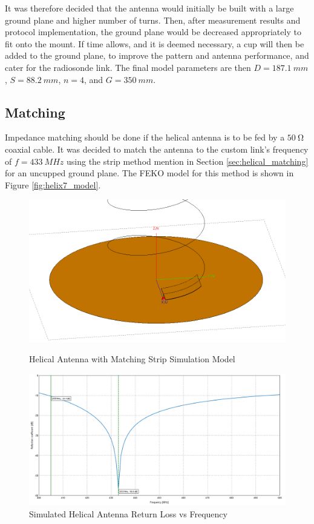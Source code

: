 It was therefore decided that the antenna would initially be built with a large ground plane and higher number of turns. Then, after measurement results and protocol implementation, the ground plane would be decreased appropriately to fit onto the mount. If time allows, and it is deemed necessary, a cup will then be added to the ground plane, to improve the pattern and antenna performance, and cater for the radiosonde link. The final model parameters are then $D = \SI{187.1}{mm}$, $S = \SI{88.2}{mm}$, $n = 4$, and $G = \SI{350}{mm}$.

\subsection{Matching}
Impedance matching should be done if the helical antenna is to be fed by a $\SI{50}{\ohm}$ coaxial cable. It was decided to match the antenna to the custom link's frequency of $f = \SI{433}{MHz}$ using the strip method mention in Section \ref{sec:helical_matching} for an uncupped ground plane. The FEKO model for this method is shown in Figure \ref{fig:helix7_model}.


\begin{figure}[!htb]
  \begin{minipage}{.4\textwidth}
    \centering
    \includegraphics[width=0.95\linewidth]{helix7_model}
    \caption{Helical Antenna with Matching Strip Simulation Model}
    \label{fig:helix7_model}
  \end{minipage}
  \begin{minipage}{.58\textwidth}
    \centering
    \includegraphics[width=0.95\linewidth]{helix7_returnLoss}
    \caption{Simulated Helical Antenna Return Loss vs Frequency}
    \label{fig:helix7_returnLoss}
  \end{minipage}
\end{figure}

